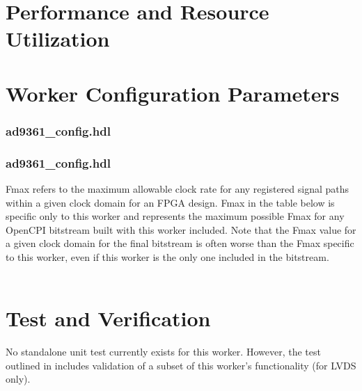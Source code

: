 \documentclass{article}
\def\comp{ad9361\_config}
\edef\ecomp{ad9361_config}
\begin{document}
\begin{landscape}
\section*{Performance and Resource Utilization}
\section*{Worker Configuration Parameters}
\subsubsection*{\comp.hdl}

\subsubsection*{\comp.hdl}
Fmax refers to the maximum allowable clock rate for any registered signal paths within a given clock domain for an FPGA design. Fmax in the table below is specific only to this worker and represents the maximum possible Fmax for any OpenCPI bitstream built with this worker included. Note that the Fmax value for a given clock domain for the final bitstream is often worse than the Fmax specific to this worker, even if this worker is the only one included in the bitstream. \\ \\

%


\end{landscape}


\section*{Test and Verification}
No standalone unit test currently exists for this worker. However, the test outlined in \cite{dac_comp_datasheet} includes validation of a subset of this worker's functionality (for LVDS only).
\end{document}
